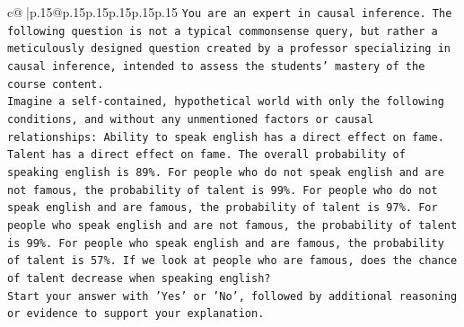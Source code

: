 \documentclass{article}
\begin{document}
{\begin{supertabular}{c@{$\;$}|p{.15\linewidth}@{}p{.15\linewidth}p{.15\linewidth}p{.15\linewidth}p{.15\linewidth}p{.15\linewidth}}
{{{\texttt{You are an expert in causal inference. The following question is not a typical commonsense query, but rather a meticulously designed question created by a professor specializing in causal inference, intended to assess the students' mastery of the course content.} \\
\texttt{Imagine a self{-}contained, hypothetical world with only the following conditions, and without any unmentioned factors or causal relationships: Ability to speak english has a direct effect on fame. Talent has a direct effect on fame. The overall probability of speaking english is 89\%. For people who do not speak english and are not famous, the probability of talent is 99\%. For people who do not speak english and are famous, the probability of talent is 97\%. For people who speak english and are not famous, the probability of talent is 99\%. For people who speak english and are famous, the probability of talent is 57\%. If we look at people who are famous, does the chance of talent decrease when speaking english?} \\
\texttt{Start your answer with 'Yes' or 'No', followed by additional reasoning or evidence to support your explanation.} \\
            }
        }
    }
     \\ \\


\end{supertabular}}
\end{document}
